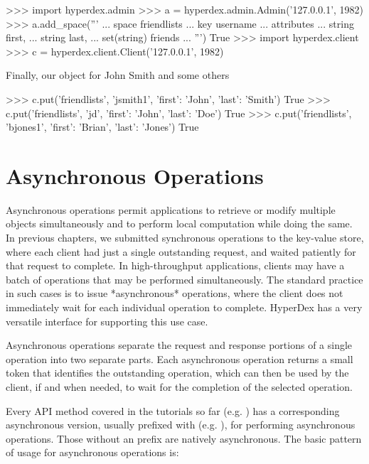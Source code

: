 \begin{pythoncode}
>>> import hyperdex.admin
>>> a = hyperdex.admin.Admin('127.0.0.1', 1982)
>>> a.add_space('''
... space friendlists
... key username
... attributes
...    string first,
...    string last,
...    set(string) friends
... ''')
True
>>> import hyperdex.client
>>> c = hyperdex.client.Client('127.0.0.1', 1982)
\end{pythoncode}

Finally, our object for John Smith and some others

\begin{pythoncode}
>>> c.put('friendlists', 'jsmith1', {'first': 'John', 'last': 'Smith'})
True
>>> c.put('friendlists', 'jd', {'first': 'John', 'last': 'Doe'})
True
>>> c.put('friendlists', 'bjones1', {'first': 'Brian', 'last': 'Jones'})
True
\end{pythoncode}

\section{Asynchronous Operations}
\label{sec:async-ops:ops}

Asynchronous operations permit applications to retrieve or modify multiple
objects simultaneously and to perform local computation while doing the same.
In previous chapters, we submitted synchronous operations to the key-value
store, where each client had just a single outstanding request, and waited
patiently for that request to complete.  In high-throughput applications,
clients may have a batch of operations that may be performed simultaneously.
The standard practice in such cases is to issue *asynchronous* operations, where
the client does not immediately wait for each individual operation to complete.
HyperDex has a very versatile interface for supporting this use case.

Asynchronous operations separate the request and response portions of a single
operation into two separate parts.  Each asynchronous operation returns a small
token that identifies the outstanding operation, which can then be used by the
client, if and when needed, to wait for the completion of the selected
operation.

Every API method covered in the tutorials so far (e.g. ) has a
corresponding asynchronous version, usually prefixed with  (e.g.
), for performing asynchronous operations.  Those without an
 prefix are natively asynchronous.  The basic pattern of usage for
asynchronous operations is:

